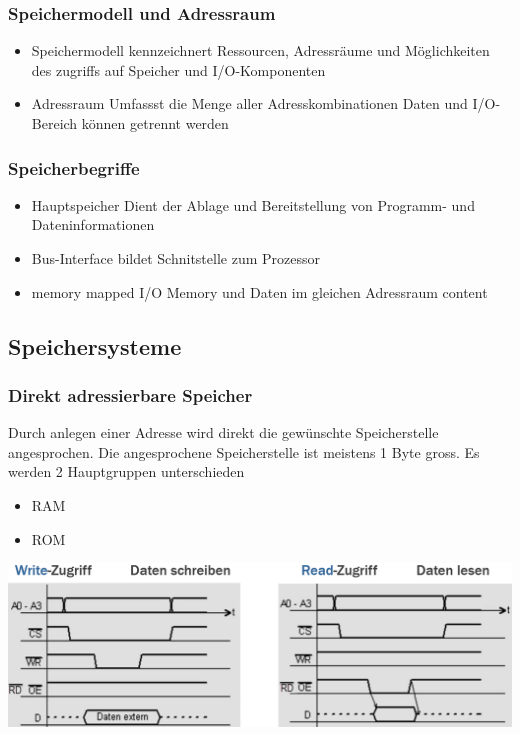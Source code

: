 \subsubsection{Speichermodell und Adressraum}
\begin{itemize}
    \item Speichermodell
    \subitem kennzeichnert Ressourcen, Adressräume und Möglichkeiten des zugriffs auf Speicher und I/O-Komponenten
    \item Adressraum
    \subitem Umfassst die Menge aller Adresskombinationen
    \subitem Daten und I/O-Bereich können getrennt werden
\end{itemize}

\subsubsection{Speicherbegriffe}
\begin{itemize}
    \item Hauptspeicher
    \subitem Dient der Ablage und Bereitstellung von Programm- und Dateninformationen
    \item Bus-Interface
    \subitem bildet Schnitstelle zum Prozessor
    \item memory mapped I/O
    \subitem Memory und Daten im gleichen Adressraum
    content
\end{itemize}

\subsection{Speichersysteme}
\subsubsection{Direkt adressierbare Speicher}
\begin{minipage}{0.5\linewidth}
    Durch anlegen einer Adresse wird direkt die gewünschte Speicherstelle angesprochen.
    Die angesprochene Speicherstelle ist meistens 1 Byte gross.\newline
    Es werden 2 Hauptgruppen unterschieden
    \begin{itemize}
        \item RAM
        \item ROM
    \end{itemize}
\end{minipage}
\begin{minipage}{0.5\linewidth}
    \includegraphics[width=\textwidth]{images/SystembusSpeicherSpeichersystem/SpeicherSysDirectMem}
\end{minipage}\newline


